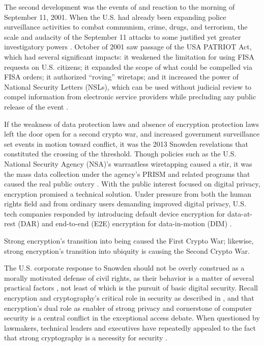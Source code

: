 The second development was the events of and reaction to the morning of September 11, 2001. When the U.S. had already
been expanding police surveillance activities to combat communism, crime, drugs, and terrorism, the scale and audacity
of the September 11 attacks to some justified yet greater investigatory powers \cite{bloss_escalating_2007}. October of
2001 saw passage of the USA PATRIOT Act, which had several significant impacts: it weakened the limitation for using
FISA requests on U.S. citizens; it expanded the scope of what could be compelled via FISA orders; it authorized
``roving'' wiretaps; and it increased the power of National Security Letters (NSLs), which can be used without judicial
review to compel information from electronic service providers while precluding any public release of the event
\cite{sensenbrenner_2001} \cite{shamsi_2011}.

If the weakness of data protection laws and absence of encryption protection laws left the door open for a second crypto
war, and increased government surveillance set events in motion toward conflict, it was the 2013 Snowden revelations
that constituted the crossing of the threshold. Though policies such as the U.S. National Security Agency (NSA)'s
warrantless wiretapping caused a stir, it was the mass data collection under the agency's PRISM and related programs
that caused the real public outcry \cite{landau_making_2013}. With the public interest focused on digital privacy,
encryption promised a technical solution. Under pressure from both the human rights field and from ordinary users
demanding improved digital privacy, U.S. tech companies responded by introducing default device encryption for
data-at-rest (DAR) and end-to-end (E2E) encryption for data-in-motion (DIM) \cite{treguer_us_2018}.

Strong encryption's transition into being caused the First Crypto War; likewise, strong encryption's transition into
ubiquity is causing the Second Crypto War.

The U.S. corporate response to Snowden should not be overly construed as a morally motivated defense of civil rights, as
their behavior is a matter of several practical factors \cite{treguer_us_2018}, not least of which is the pursuit of
basic digital security. Recall encryption and cryptography's critical role in security as described in
, and that encryption's dual role as enabler of strong privacy and cornerstone of computer
security is a central conflict in the exceptional access debate. When questioned by lawmakers, technical leaders and
executives have repeatedly appealed to the fact that strong cryptography is a necessity for security
\cite{schulze_clipper_2017}.

